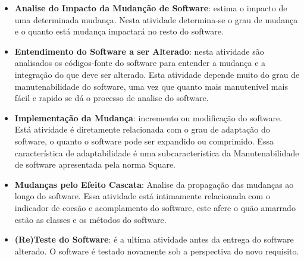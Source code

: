 \begin{itemize}
\item \textbf{Analise do Impacto da Mudanção de Software}: estima o impacto de uma determinada mudança. Nesta atividade determina-se o grau de mudança e o quanto está mudança impactará no resto do software. 
\item \textbf{Entendimento do Software a ser Alterado}: nesta atividade são analisados os códigos-fonte do software para entender a mudança e a integração do que deve ser alterado. Esta atividade depende muito do grau de manutenabilidade do software, uma vez que quanto mais manutenível mais fácil e rapido se dá o processo de analise do software.
\item \textbf{Implementação da Mudança}: incremento ou modificação do software. Está atividade é diretamente relacionada com o grau de adaptação do software, o quanto o software pode ser expandido ou comprimido. Essa característica de adaptabilidade é uma subcaracterística da Manutenabilidade de software apresentada pela norma Square. 
\item \textbf{Mudanças pelo Efeito Cascata}: Analise da propagação das mudanças ao longo do software. Essa atividade está intimamente relacionada com o indicador de coesão e acomplamento do software, este afere o quão amarrado estão as classes e os métodos do software.
\item \textbf{(Re)Teste do Software}: é a ultima atividade antes da entrega do software alterado. O software é testado novamente sob a perspectiva do novo requisito.
\end{itemize}

